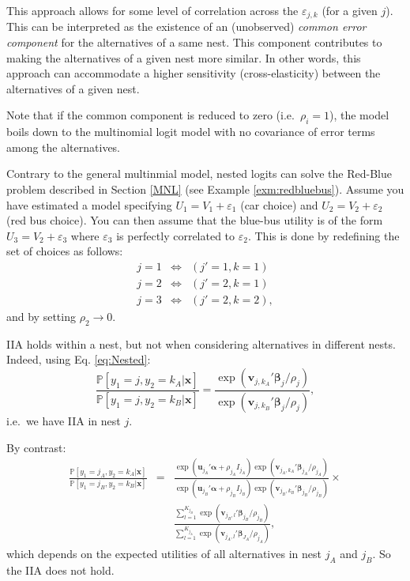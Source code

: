 \documentclass[
  12pt,
]{book}
\theoremstyle{definition}
\theoremstyle{definition}
\theoremstyle{definition}
\theoremstyle{definition}
\theoremstyle{remark}
\begin{document}
This approach allows for some level of correlation across the \(\varepsilon_{j,k}\) (for a given \(j\)). This can be interpreted as the existence of an (unobserved) \emph{common error component} for the alternatives of a same nest. This component contributes to making the alternatives of a given nest more similar. In other words, this approach can accommodate a higher sensitivity (cross-elasticity) between the alternatives of a given nest.

Note that if the common component is reduced to zero (i.e.~\(\rho_i=1\)), the model boils down to the multinomial logit model with no covariance of error terms among the alternatives.

Contrary to the general multinmial model, nested logits can solve the Red-Blue problem described in Section \ref{MNL} (see Example \ref{exm:redbluebus}). Assume you have estimated a model specifying \(U_{1} = V_{1} + \varepsilon_{1}\) (car choice) and \(U_{2} = V_{2} + \varepsilon_{2}\) (red bus choice). You can then assume that the blue-bus utility is of the form \(U_{3} = V_{2} + \varepsilon_{3}\) where \(\varepsilon_{3}\) is perfectly correlated to \(\varepsilon_{2}\). This is done by redefining the set of choices as follows:
\begin{eqnarray*}
j=1 &\Leftrightarrow& (j'=1,k=1) \\
j=2 &\Leftrightarrow& (j'=2,k=1) \\
j=3 &\Leftrightarrow& (j'=2,k=2),
\end{eqnarray*}
and by setting \(\rho_2 \rightarrow 0\).

IIA holds within a nest, but not when considering alternatives in different nests. Indeed, using Eq. \eqref{eq:Nested}:
\[
\frac{\mathbb{P}[y_1=j,y_2=k_A|\mathbf{x}] }{\mathbb{P}[y_1=j,y_2=k_B|\mathbf{x}]} = \frac{\exp(\mathbf{v}_{j,k_A}'\boldsymbol\beta_j/\rho_j)}{\exp(\mathbf{v}_{j,k_B}'\boldsymbol\beta_j/\rho_j)},
\]
i.e.~we have IIA in nest \(j\).

By contrast:
\begin{eqnarray*}
\frac{\mathbb{P}[y_1=j_A,y_2=k_A|\mathbf{x}] }{\mathbb{P}[y_1=j_B,y_2=k_B|\mathbf{x}]} &=& \frac{\exp(\mathbf{u}_{j_A}'\boldsymbol\alpha + \rho_{j_A} I_{j_A})\exp(\mathbf{v}_{{j_A},{k_A}}'\boldsymbol\beta_{j_A}/\rho_{j_A})}{\exp(\mathbf{u}_{j_B}'\boldsymbol\alpha + \rho_{j_B} I_{j_B})\exp(\mathbf{v}_{{j_B},{k_B}}'\boldsymbol\beta_{j_B}/\rho_{j_B})}\times\\
&& \frac{\sum_{l=1}^{K_{j_B}} \exp(\mathbf{v}_{{j_B},l}'\boldsymbol\beta_{j_B}/\rho_{j_B})}{\sum_{l=1}^{K_{j_A}} \exp(\mathbf{v}_{{j_A},l}'\boldsymbol\beta_{J_A}/\rho_{j_A})},
\end{eqnarray*}
which depends on the expected utilities of all alternatives in nest \(j_A\) and \(j_B\). So the IIA does not hold.
\end{document}
